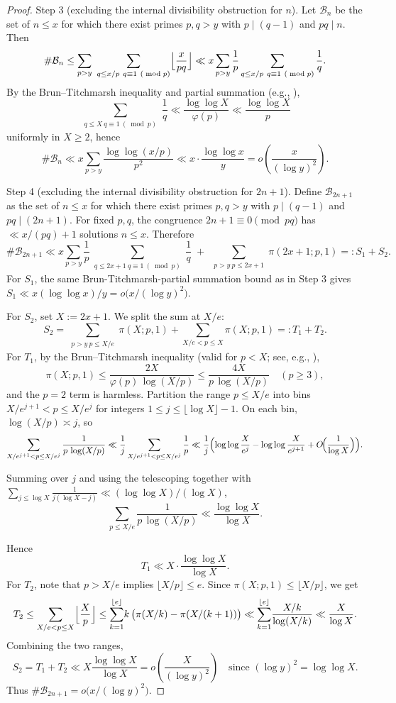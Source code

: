 \documentclass[12pt]{article}
\theoremstyle{remark}
\begin{document}
\begin{proof}
Step 3 (excluding the internal divisibility obstruction for $n$). Let $\mathcal B_n$ be the set of $n\le x$ for which there exist primes $p,q>y$ with $p\mid(q-1)$ and $pq\mid n$. Then
$$\#\mathcal B_n\le \sum_{p>y}\ \sum_{\substack{q\le x/p\ q\equiv1\ (\bmod p)}} \Bigl\lfloor\frac{x}{pq}\Bigr\rfloor\ll x\sum_{p>y}\frac{1}{p}\sum_{\substack{q\le x/p\ q\equiv1\ (\bmod p)}}\frac{1}{q}.$$
By the Brun--Titchmarsh inequality and partial summation (e.g., \cite{MV2007,IK2004}),
$$\sum_{\substack{q\le X\ q\equiv1\ (\bmod p)}}\frac{1}{q}\ll \frac{\log\log X}{\varphi(p)}\ll \frac{\log\log X}{p}$$
uniformly in $X\ge2$, hence
$$\#\mathcal B_n\ll x\sum_{p>y}\frac{\log\log(x/p)}{p^2}\ll x\cdot\frac{\log\log x}{y}=o\!\left(\frac{x}{(\log y)^2}\right).$$

Step 4 (excluding the internal divisibility obstruction for $2n+1$). Define $\mathcal B_{2n+1}$ as the set of $n\le x$ for which there exist primes $p,q>y$ with $p\mid(q-1)$ and $pq\mid(2n+1)$. For fixed $p,q$, the congruence $2n+1\equiv0\pmod{pq}$ has $\ll x/(pq)+1$ solutions $n\le x$. Therefore
\[
\#\mathcal B_{2n+1}\ll x\sum_{p>y}\frac{1}{p}\sum_{\substack{q\le 2x+1\ q\equiv1\ (\bmod p)}}\frac{1}{q}\; +\; \sum_{\substack{p>y\ p\le 2x+1}}\!\pi(2x+1; p,1)=:S_1+S_2.
\]
For $S_1$, the same Brun-Titchmarsh-partial summation bound as in Step 3 gives $S_1\ll x(\log\log x)/y=o\bigl(x/(\log y)^2\bigr)$.

For $S_2$, set $X:=2x+1$. We split the sum at $X/e$:
$$S_2=\sum_{\substack{p>y\ p\le X/e}}\!\pi(X;p,1)+\sum_{X/e<p\le X}\!\pi(X;p,1)=:T_1+T_2.$$
For $T_1$, by the Brun--Titchmarsh inequality (valid for $p<X$; see, e.g., \cite{MV2007,IK2004}),
$$\pi(X;p,1)\le \frac{2X}{\varphi(p)\,\log(X/p)}\le \frac{4X}{p\,\log(X/p)}\quad(p\ge3),$$
and the $p=2$ term is harmless. Partition the range $p\le X/e$ into bins $X/e^{j+1}<p\le X/e^{j}$ for integers $1\le j\le \lfloor\log X\rfloor-1$. On each bin, $\log(X/p)\asymp j$, so
$$\sum_{X/e^{j+1}<p\le X/e^{j}} \frac{1}{p\,\log(X/p)}\ll \frac{1}{j}\sum_{X/e^{j+1}<p\le X/e^{j}}\frac{1}{p}
\ll \frac{1}{j}\Bigl(\log\log\frac{X}{e^{j}}-\log\log\frac{X}{e^{j+1}}+O\!\Bigl(\frac{1}{\log X}\Bigr)\Bigr).$$
\begin{flushleft}
Summing over $j$ and using the telescoping together with $\sum_{j\le \log X} \frac{1}{j(\log X-j)}\ll (\log\log X)/(\log X)$,
$$\sum_{p\le X/e}\frac{1}{p\,\log(X/p)}\ll \frac{\log\log X}{\log X}.$$
\end{flushleft}
Hence
$$T_1\ll X\cdot\frac{\log\log X}{\log X}.$$
For $T_2$, note that $p>X/e$ implies $\lfloor X/p\rfloor\le e$. Since $\pi(X;p,1)\le \lfloor X/p\rfloor$, we get
$$T_2\le \sum_{X/e<p\le X}\Bigl\lfloor\frac{X}{p}\Bigr\rfloor\le \sum_{k=1}^{\lfloor e\rfloor}\!k\,\bigl(\pi(X/k)-\pi(X/(k+1))\bigr)\ll \sum_{k=1}^{\lfloor e\rfloor}\!\frac{X/k}{\log(X/k)}\ll \frac{X}{\log X}.$$
Combining the two ranges,
$$S_2=T_1+T_2\ll X\frac{\log\log X}{\log X}=o\!\left(\frac{X}{(\log y)^2}\right)\quad\text{since }(\log y)^2=\log\log X.$$
Thus $\#\mathcal B_{2n+1}=o\bigl(x/(\log y)^2\bigr)$.


\end{proof}
\end{document}
